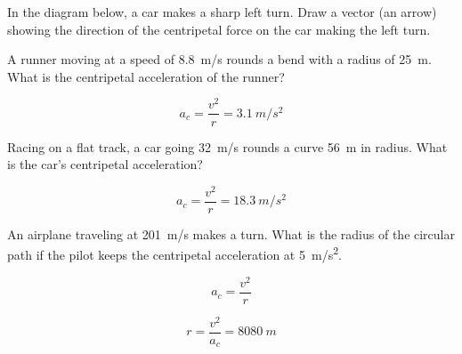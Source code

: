\documentclass[../main-physics-workbook.tex]{subfiles}
\begin{document}
\begin{questions}

\question
In the diagram below, a car makes a sharp left turn. Draw a vector (an arrow) showing the direction of the centripetal force on the car making the left turn.

\begin{center}
\end{center}

\question 
A runner moving at a speed of \SI{8.8}{m/s} rounds a bend with a radius of \SI{25}{m}. What is the centripetal acceleration of the runner?

\begin{solution}
\begin{equation*}
    a_c = \frac{v^2}{r} = \SI{3.1}{m/s^2}
\end{equation*}
\end{solution}

\question
Racing on a flat track, a car going \SI{32}{m/s} rounds a curve \SI{56}{m} in radius. What is the car's centripetal acceleration?

\begin{solution}
\begin{equation*}
    a_c = \frac{v^2}{r} = \SI{18.3}{m/s^2}
\end{equation*}
\end{solution}

\question
An airplane traveling at \SI{201}{m/s} makes a turn. What is the radius of the circular path if the pilot keeps the centripetal acceleration at \SI{5}{m/s^2}.

\begin{solution}
\begin{equation*}
    a_c = \frac{v^2}{r}
\end{equation*}

\begin{equation*}
    r = \frac{v^2}{a_c} = \SI{8080}{m}
\end{equation*}
\end{solution}


\end{questions}
\end{document}
